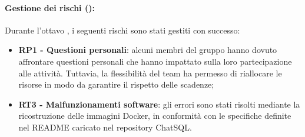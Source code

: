 \paragraph*{Gestione dei rischi ():}
\vspace{0.5\baselineskip}
\par Durante l'ottavo , i seguenti rischi sono stati gestiti con successo:
\begin{itemize}
  \item \textbf{RP1 - Questioni personali}: alcuni membri del gruppo hanno dovuto affrontare questioni personali che hanno impattato sulla loro partecipazione alle attività. Tuttavia, la flessibilità del team ha permesso di riallocare le risorse in modo da garantire il rispetto delle scadenze;
  \item \textbf{RT3 - Malfunzionamenti software}: gli errori sono stati risolti mediante la ricostruzione delle immagini Docker, in conformità con le specifiche definite nel README caricato nel repository ChatSQL.
\end{itemize}
